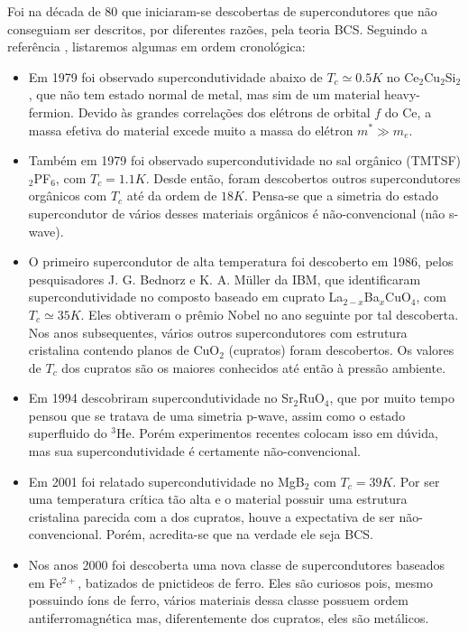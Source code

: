 \documentclass[a4paper,10pt]{article}
\begin{document}
Foi na década de 80 que iniciaram-se descobertas de supercondutores que não conseguiam ser descritos, por diferentes razões, pela teoria BCS. Seguindo a referência \cite{timm}, listaremos algumas em ordem cronológica:
\begin{itemize}
\item Em 1979 foi observado supercondutividade abaixo de $T_c \simeq 0.5 \unit{K}$ no Ce$_2$Cu$_2$Si$_2$, que não tem estado normal de metal, mas sim de um material heavy-fermion. Devido às grandes correlações dos elétrons de orbital $f$ do Ce, a massa efetiva do material excede muito a massa do elétron $m^* \gg m_e$.
\item Também em 1979 foi observado supercondutividade no sal orgânico (TMTSF)$_2$PF$_6$, com $T_c = 1.1 \unit{K}$. Desde então, foram descobertos outros supercondutores orgânicos com $T_c$ até da ordem de $18 \unit{K}$. Pensa-se que a simetria do estado supercondutor de vários desses materiais orgânicos é não-convencional (não s-wave).
\item O primeiro supercondutor de alta temperatura foi descoberto em 1986, pelos pesquisadores J. G. Bednorz e K. A. Müller da IBM, que identificaram supercondutividade no composto baseado em cuprato La$_{2-x}$Ba$_x$CuO$_4$, com $T_c \simeq 35 \unit{K}$. Eles obtiveram o prêmio Nobel no ano seguinte por tal descoberta. Nos anos subsequentes, vários outros supercondutores com estrutura cristalina contendo planos de CuO$_2$ (cupratos) foram descobertos. Os valores de $T_c$ dos cupratos são os maiores conhecidos até então à pressão ambiente.

\item Em 1994 descobriram supercondutividade no Sr$_2$RuO$_4$, que por muito tempo pensou que se tratava de uma simetria p-wave, assim como o estado superfluido do $^3$He. Porém experimentos recentes colocam isso em dúvida, mas sua supercondutividade é certamente não-convencional.

\item Em 2001 foi relatado supercondutividade no MgB$_2$ com $T_c = 39 \unit{K}$. Por ser uma temperatura crítica tão alta e o material possuir uma estrutura cristalina parecida com a dos cupratos, houve a expectativa de ser não-convencional. Porém, acredita-se que na verdade ele seja BCS.

\item Nos anos 2000 foi descoberta uma nova classe de supercondutores baseados em Fe$^{2+}$, batizados de pnictideos de ferro. Eles são curiosos pois, mesmo possuindo íons de ferro, vários materiais dessa classe possuem ordem antiferromagnética mas, diferentemente dos cupratos, eles são metálicos.
\end{itemize}
\end{document}
